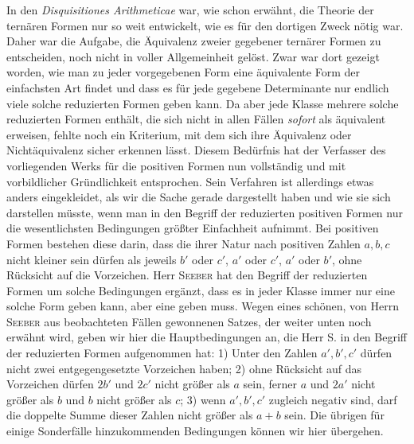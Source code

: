 In den \emph{Disquisitiones Arithmeticae} war, wie schon erwähnt, die Theorie der ternären Formen nur so weit entwickelt, wie es für den dortigen Zweck nötig war. Daher war die Aufgabe, die Äquivalenz zweier gegebener ternärer Formen zu entscheiden, noch nicht in voller Allgemeinheit gelöst. Zwar war dort gezeigt worden, wie man zu jeder vorgegebenen Form eine äquivalente Form der einfachsten Art findet und dass es für jede gegebene Determinante nur endlich viele solche reduzierten Formen geben kann. Da aber jede Klasse mehrere solche reduzierten Formen enthält, die sich nicht in allen Fällen \emph{sofort} als äquivalent erweisen, fehlte noch ein Kriterium, mit dem sich ihre Äquivalenz oder Nichtäquivalenz sicher erkennen lässt. Diesem Bedürfnis hat der Verfasser des vorliegenden Werks für die positiven Formen nun vollständig und mit vorbildlicher Gründlichkeit entsprochen. Sein Verfahren ist allerdings etwas anders eingekleidet, als wir die Sache gerade dargestellt haben und wie sie sich darstellen müsste, wenn man in den Begriff der reduzierten positiven Formen nur die wesentlichsten Bedingungen größter Einfachheit aufnimmt. Bei positiven Formen bestehen diese darin, dass die ihrer Natur nach positiven Zahlen $a,b,c$ nicht kleiner sein dürfen als jeweils $b'$ oder $c'$, $a'$ oder $c'$, $a'$ oder $b'$, ohne Rücksicht auf die Vorzeichen. Herr \textsc{Seeber} hat den Begriff der reduzierten Formen um solche Bedingungen ergänzt, dass es in jeder Klasse immer nur eine solche Form geben kann, aber eine geben muss. Wegen eines schönen, von Herrn \textsc{Seeber} aus beobachteten Fällen gewonnenen Satzes, der weiter unten noch erwähnt wird, geben wir hier die Hauptbedingungen an, die Herr S. in den Begriff der reduzierten Formen
aufgenommen hat: 1) Unter den Zahlen $a',b',c'$ dürfen nicht zwei entgegengesetzte Vorzeichen haben; 2) ohne Rücksicht auf das Vorzeichen dürfen $2b'$ und $2c'$ nicht größer als $a$ sein, ferner $a$ und $2a'$ nicht größer als $b$ und $b$ nicht größer als $c$; 3) wenn $a',b',c'$ zugleich negativ sind, darf die doppelte Summe dieser Zahlen nicht größer als $a+b$ sein. Die übrigen für einige Sonderfälle hinzukommenden Bedingungen können wir hier übergehen.

